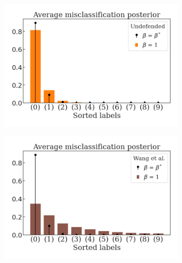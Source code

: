 \begin{figure}[H]
    \centering
    \begin{subfigure}[b]{0.3\textwidth}
        \centering
        \includegraphics[width=\textwidth]{img/results_discussion/adversarial/PGD_0.0314_probability_misclass_standard.png}
    \end{subfigure}
    \hfill
    \begin{subfigure}[b]{0.3\textwidth}
        \centering
        \includegraphics[width=\textwidth]{img/results_discussion/adversarial/PGD_0.0314_probability_misclass_wang2023.png}
    \end{subfigure}
    \hfill
    \begin{subfigure}[b]{0.3\textwidth}
        \centering

\end{subfigure}
\end{figure}
